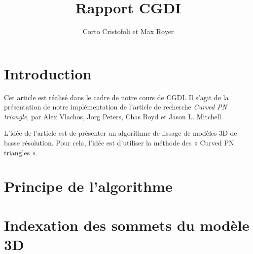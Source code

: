 \documentclass{article}
\title{Rapport CGDI}
\author{Corto Cristofoli et Max Royer}
\begin{document}
\maketitle
\tableofcontents



\section{Introduction}
Cet article est réalisé dans le cadre de notre cours de CGDI.
Il s'agit de la présentation de notre implémentation de l'article
de recherche \textit{Curved PN triangle}, par Alex Vlachos, Jorg Peters,
Chas Boyd et Jason L. Mitchell.

L'idée de l'article est de présenter un algorithme de lissage de modèles 3D de
basse résolution. Pour cela, l'idée est d'utiliser la méthode des « Curved PN
triangles ».


\section{Principe de l'algorithme}

\section{Indexation des sommets du modèle 3D}

\end{document}

